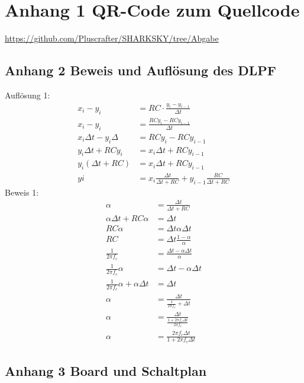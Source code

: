 \documentclass[12pt,a4paper, ngerman]{article}
\begin{document}
\section{Anhang 1 QR-Code zum Quellcode}
\centering\large{\url{https://github.com/Pluscrafter/SHARKSKY/tree/Abgabe}}
\newpage
\begin{flushleft} 
\section{Anhang 2 Beweis und Auflösung des DLPF}
\end{flushleft}
Auflösung 1:
\begin{align*} 
x_{i}-y_{i}&=RC\cdot \frac{y_{i}-y_{i-1}}{\Delta t} \\ 
x_{i}-y_{i}&=\frac{RCy_{i}-RCy_{i-1}}{\Delta t}\\
x_{i}\Delta t-y_{i}\Delta&=RCy_{i}-RCy_{i-1} \\
y_{i}\Delta t+RCy_{i}&=x_{i}\Delta t+RCy_{i-1} \\
y_{i}(\Delta t+RC)&=x_{i}\Delta t+RCy_{i-1} \\
y{i}&=x_{i}\frac{\Delta t}{\Delta t+RC} + y_{i-1}\frac{RC}{\Delta t+RC}
\end{align*}
Beweis 1:
\begin{align*}
\alpha&=\frac{\Delta t}{\Delta t+RC} \\
\alpha \Delta t+RC\alpha &= \Delta t \\
RC\alpha &= \Delta t \alpha \Delta t \\
RC &= \Delta t \frac{1-\alpha}{\alpha}\\
\frac{1}{2\pi f_{c}} &= \frac{\Delta t -\alpha\Delta t}{\alpha} \\
\frac{1}{2\pi f_{c}} \alpha &= \Delta t -\alpha\Delta t \\
\frac{1}{2\pi f_{c}} \alpha + \alpha\Delta t &= \Delta t \\
\alpha &= \frac{\Delta t}{\frac{1}{2\pi f_{c}} + \Delta t} \\
\alpha &= \frac{\Delta t}{\frac{1+2\pi f_{c}\Delta t}{2\pi f_{c}}} \\
\alpha &= \frac{2\pi f_{c}\Delta t}{1+2\pi f_{c}\Delta t} 
\end{align*}
\newpage
\begin{flushleft} 
\section[Anhang 3 Board und Schaltplan]{Anhang 3 Board und Schaltplan}
\end{flushleft}
\end{document}
